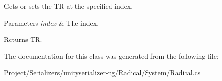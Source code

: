Gets or sets the TR at the specified index. 


\begin{DoxyParams}{Parameters}
{\em index} & The index.\\
\hline
\end{DoxyParams}
\begin{DoxyReturn}{Returns}
TR.
\end{DoxyReturn}


The documentation for this class was generated from the following file\+:\begin{DoxyCompactItemize}
\item 
Project/\+Serializers/unityserializer-\/ng/\+Radical/\+System/Radical.\+cs\end{DoxyCompactItemize}
